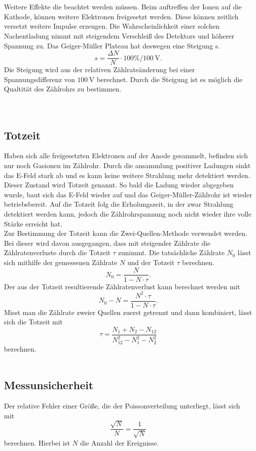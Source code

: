 \\
\\
Weitere Effekte die beachtet werden müssen. Beim auftreffen der Ionen auf die Kathode,
können weitere Elektronen freigesetzt werden. Diese können zeitlich versetzt weitere Impulse erzeugen.
Die Wahrscheinlichkeit einer solchen Nachentladung nimmt mit steigendem Verschleiß des Detektors und höherer Spannung zu.
Das Geiger-Müller Plateau hat deswegen eine Steigung s.
\begin{equation*}
    s = \frac{ΔN}{N} \cdot 100\%/\SI{100}{\volt}.
\end{equation*}
Die Steigung wird aus der relativen Zählrateänderung bei einer Spannungsdifferenz von $\SI{100}{\volt}$ berechnet.
Durch die Steigung ist es möglich die Qualtität des Zählrohrs zu bestimmen.\\
\\
\\
\subsection{Totzeit}
\label{sec:Totzeit}

Haben sich alle freigesetzten Elektronen auf der Anode gesammelt, befinden sich nur noch Gasionen im Zählrohr.
Durch die ansammlung positiver Ladungen sinkt das E-Feld stark ab und es kann keine weitere Strahlung mehr detektiert werden.
Dieser Zustand wird Totzeit genannt. So bald die Ladung wieder abgegeben wurde, baut sich das E-Feld wieder auf und das Geiger-Müller-Zählrohr ist wieder betriebsbereit.
Auf die Totzeit folg die Erholungszeit, in der zwar Strahlung detektiert werden kann, jedoch die Zählrohrspannung noch nicht wieder ihre volle Stärke erreicht hat.
\\
Zur Bestimmung der Totzeit kann die Zwei-Quellen-Methode verwendet werden.
Bei dieser wird davon ausgegangen, dass mit steigender Zählrate die Zählratenverluste durch die Totzeit $τ$ zunimmt.
Die tatsächliche Zählrate $N_0$ lässt sich mithilfe der gemessenen Zählrate $N$ und der Totzeit $τ$ berechnen.
\begin{equation*}
    N_0 = \frac{N}{1-N \cdot τ}.
\end{equation*}
Der aus der Totzeit resultierende Zählratenverlust kann berechnet werden mit
\begin{equation*}
    N_0 - N = \frac{N^2 \cdot τ}{1 - N \cdot τ}.
\end{equation*}
Misst man die Zählrate zweier Quellen zuerst getrennt und dann kombiniert, lässt sich die Totzeit mit
\begin{equation*}
    τ = \frac{N_1 + N_2 - N_{12}}{N_{12}^2 - N_1^2 - N_2^2}
\end{equation*}
berechnen.
\\
\\
\subsection{Messunsicherheit}
\label{sec:Messunsicherheit}
Der relative Fehler einer Größe, die der Poissonverteilung unterliegt, lässt sich mit
\begin{equation}
    \frac{\sqrt{N}}{N} = \frac{1}{\sqrt{N}}
\end{equation}
berechnen. Hierbei ist $N$ die Anzahl der Ereignisse.